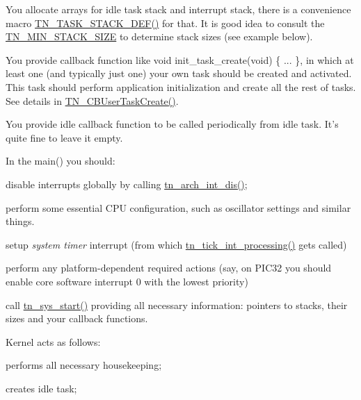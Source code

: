 \begin{DoxyItemize}
\item You allocate arrays for idle task stack and interrupt stack, there is a convenience macro {\ttfamily \hyperlink{tn__tasks_8h_a120e01d9dddd21ac11827595e88d7c36}{T\+N\+\_\+\+T\+A\+S\+K\+\_\+\+S\+T\+A\+C\+K\+\_\+\+D\+E\+F()}} for that. It is good idea to consult the {\ttfamily \hyperlink{tn__arch__example_8h_ad465f81e8ea15a530747b1147dbe4605}{T\+N\+\_\+\+M\+I\+N\+\_\+\+S\+T\+A\+C\+K\+\_\+\+S\+I\+Z\+E}} to determine stack sizes (see example below).
\item You provide callback function like {\ttfamily void init\+\_\+task\+\_\+create(void) \{ ... \}}, in which at least one (and typically just one) your own task should be created and activated. This task should perform application initialization and create all the rest of tasks. See details in {\ttfamily \hyperlink{tn__sys_8h_a94f785ff88dfca8746f34de59784883d}{T\+N\+\_\+\+C\+B\+User\+Task\+Create()}}.
\item You provide idle callback function to be called periodically from idle task. It's quite fine to leave it empty.
\item In the {\ttfamily main()} you should\+:
\begin{DoxyItemize}
\item disable interrupts globally by calling {\ttfamily \hyperlink{tn__arch_8h_a2b3f2294ac42a599662c573394b14c75}{tn\+\_\+arch\+\_\+int\+\_\+dis()}};
\item perform some essential C\+P\+U configuration, such as oscillator settings and similar things.
\item setup {\itshape system timer} interrupt (from which {\ttfamily \hyperlink{tn__sys_8h_a944d96c7a5d442d271115b6cb22a085b}{tn\+\_\+tick\+\_\+int\+\_\+processing()}} gets called)
\item perform any platform-\/dependent required actions (say, on P\+I\+C32 you should enable core software interrupt 0 with the lowest priority)
\item call {\ttfamily \hyperlink{tn__sys_8h_a62ab25d9d8ca01c02d368968f19e49bf}{tn\+\_\+sys\+\_\+start()}} providing all necessary information\+: pointers to stacks, their sizes and your callback functions.
\end{DoxyItemize}
\item Kernel acts as follows\+:
\begin{DoxyItemize}
\item performs all necessary housekeeping;
\item creates idle task;

\end{DoxyItemize}
\end{DoxyItemize}
